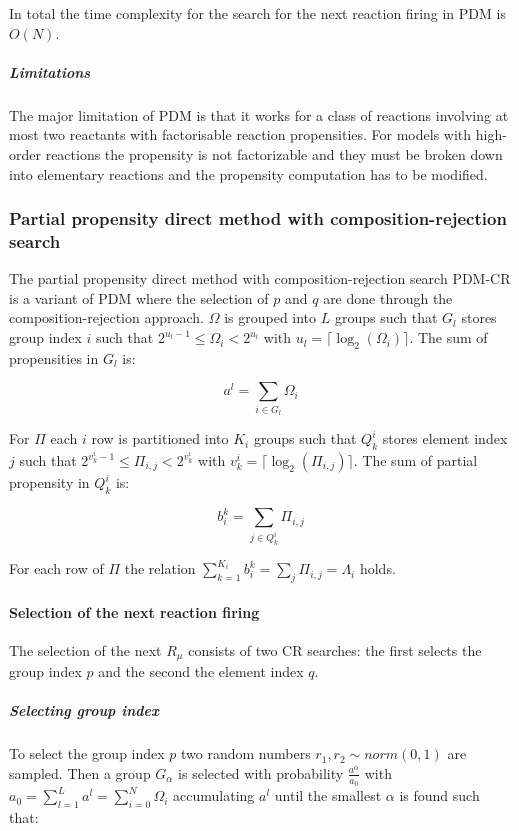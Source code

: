         In total the time complexity for the search for the next reaction firing in PDM is $O(N)$.

        \subparagraph{Limitations}
        The major limitation of PDM is that it works for a class of reactions involving at most two reactants with factorisable reaction propensities.
        For models with high-order reactions the propensity is not factorizable and they must be broken down into elementary reactions and the propensity computation has to be modified.

  \subsubsection{Partial propensity direct method with composition-rejection search}
  The partial propensity direct method with composition-rejection search PDM-CR is a variant of PDM where the selection of $p$ and $q$ are done through the composition-rejection approach.
  $\Omega$ is grouped into $L$ groups such that $G_l$ stores group index $i$ such that $2^{u_l-1}\le \Omega_i< 2^{u_l}$ with $u_l = \lceil\log_2(\Omega_i)\rceil$.
  The sum of propensities in $G_l$ is:

  $$a^l = \sum\limits_{i\in G_l}\Omega_i$$

  For $\Pi$ each $i$ row is partitioned into $K_i$ groups such that $Q_k^i$ stores element index $j$ such that $2^{v_k^i-1}\le\Pi_{i,j}<2^{v_k^i}$ with $v_k^i = \lceil\log_2(\Pi_{i,j})\rceil$.
  The sum of partial propensity in $Q_k^i$ is:

  $$b_i^k = \sum\limits_{j\in Q_k^i}\Pi_{i,j}$$

  For each row of $\Pi$ the relation $\sum\limits_{k=1}^{K_i}b_i^k = \sum\limits_{j}\Pi_{i,j} = \Lambda_i$ holds.

    \paragraph{Selection of the next reaction firing}
    The selection of the next $R_\mu$ consists of two CR searches: the first selects the group index $p$ and the second the element index $q$.

      \subparagraph{Selecting group index}
      To select the group index $p$ two random numbers $r_1,r_2\sim norm(0,1)$ are sampled.
      Then a group $G_\alpha$ is selected with probability $\frac{a^\alpha}{a_0}$ with $a_0 = \sum\limits_{l=1}^La^l = \sum\limits_{i=0}^N\Omega_i$ accumulating $a^l$ until the smallest $\alpha$ is found such that:

